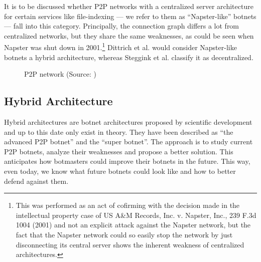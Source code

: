 \documentclass{llncs}
\begin{document}
It is to be discussed whether P2P networks with a centralized server
architecture for certain services like file-indexing --- we refer to
them as ``Napster-like'' botnets --- fall into this
category. Principally, the connection graph differs a lot from
centralized networks, but they share the same weaknesses, as could be
seen when Napster was shut down in
2001\cite{napsterWiki}.\footnote{This was performed as an act of
  cofirming with the decision made in the intellectual property case
  of US A&M Records, Inc. v. Napster, Inc., 239 F.3d 1004 (2001) and
  not an explicit attack against the Napster network, but the fact
  that the Napster network could so easily stop the network by just
  disconnecting its central server shows the inherent weakness of
  centralized architectures.}  Dittrich et
al. \cite{dittrich2007command} would consider Napster-like botnets a
hybrid architecture, whereas Steggink et al.
\cite{steggink2007detection} classify it as
decentralized. 

\begin{figure}[htbp]
  \centering
  \caption{P2P network (Source: \cite{dittrich2007command})}
  \label{p2p-network}
\end{figure}


\subsection{Hybrid Architecture}
Hybrid architectures are botnet architectures proposed by scientific
development and up to this date only exist in theory. They have been
described as ``the advanced P2P botnet''\cite{td1sc} and the ``super
botnet''\cite{vogt2007army}. The approach is to study current P2P
botnets, analyze their weaknesses and propose a better solution. This
anticipates how botmasters could improve their botnets in the
future. This way, even today, we know what future botnets could look
like and how to better defend against them.
\end{document}
